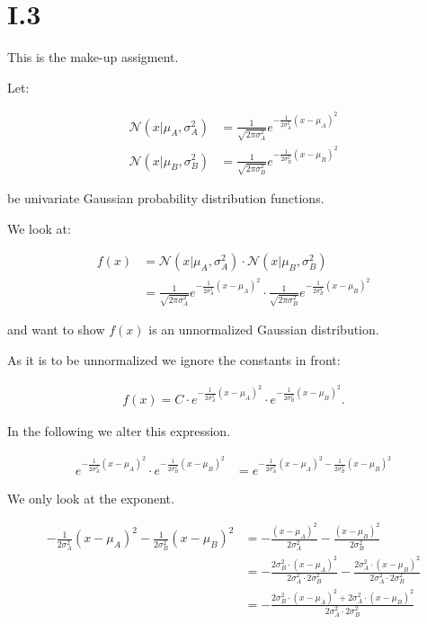 \FloatBarrier
\pagebreak
\section*{I.3}

This is the make-up assigment.

Let:

\begin{align*}
\mathcal{N} (x|\mu_A,\sigma_A^2) &= \frac{1}{\sqrt{2\pi\sigma_A^2}} e^{-\frac{1}{2\sigma_A^2}(x-\mu_A)^2} \\
\mathcal{N} (x|\mu_B,\sigma_B^2) &= \frac{1}{\sqrt{2\pi\sigma_B^2}} e^{-\frac{1}{2\sigma_B^2}(x-\mu_B)^2}
\end{align*}

be univariate Gaussian probability distribution functions.

We look at:

\begin{align*}
f(x) &= \mathcal{N} (x|\mu_A,\sigma_A^2) \cdot \mathcal{N} (x|\mu_B,\sigma_B^2) \\
     &= \frac{1}{\sqrt{2\pi\sigma_A^2}} e^{-\frac{1}{2\sigma_A^2}(x-\mu_A)^2} \cdot
\frac{1}{\sqrt{2\pi\sigma_B^2}} e^{-\frac{1}{2\sigma_B^2}(x-\mu_B)^2}
\end{align*}

and want to show $f(x)$ is an unnormalized Gaussian distribution.

As it is to be unnormalized we ignore the constants in front:

\begin{align*}
f(x) = C \cdot e^{-\frac{1}{2\sigma_A^2}(x-\mu_A)^2} \cdot e^{-\frac{1}{2\sigma_B^2}(x-\mu_B)^2}.
\end{align*}

In the following we alter this expression.

\begin{align*}
e^{-\frac{1}{2\sigma_A^2}(x-\mu_A)^2} \cdot e^{-\frac{1}{2\sigma_B^2}(x-\mu_B)^2}
&= e^{-\frac{1}{2\sigma_A^2}(x-\mu_A)^2-\frac{1}{2\sigma_B^2}(x-\mu_B)^2}
\end{align*}

We only look at the exponent.

\begin{align*}
-\frac{1}{2\sigma_A^2}(x-\mu_A)^2-\frac{1}{2\sigma_B^2}(x-\mu_B)^2 &=
-\frac{(x-\mu_A)^2}{2\sigma_A^2}-\frac{(x-\mu_B)^2}{2\sigma_B^2} \\
&= -\frac{2\sigma_B^2 \cdot (x-\mu_A)^2}{2\sigma_A^2 \cdot 2\sigma_B^2}
   -\frac{2\sigma_A^2 \cdot (x-\mu_B)^2}{2\sigma_A^2 \cdot 2\sigma_B^2}\\
&= -\frac{2\sigma_B^2 \cdot (x-\mu_A)^2+2\sigma_A^2 \cdot (x-\mu_B)^2}{2\sigma_A^2 \cdot 2\sigma_B^2}
\end{align*}

